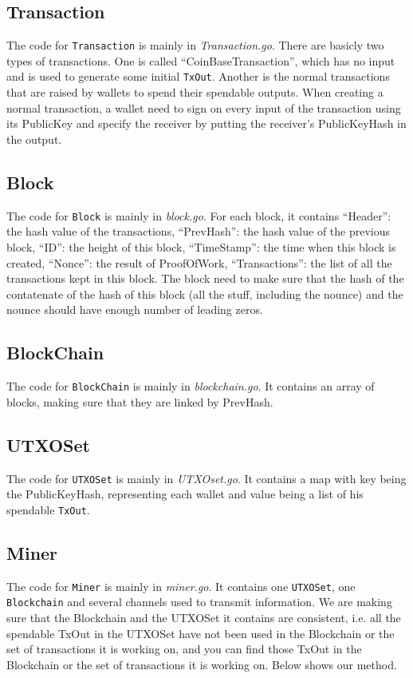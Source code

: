 \documentclass{article}
\begin{document}
\begin{spacing}{1.0}
		\subsection{Transaction}
		The code for \texttt{Transaction} is mainly in \textit{Transaction.go}. There are basicly two types of transactions. One is called ``CoinBaseTransaction'', which has no input and is used to generate some initial \texttt{TxOut}. Another is 
		the normal transactions that are raised by wallets to spend their spendable outputs.
		When creating a normal transaction, a wallet need to sign on every input of the transaction using its PublicKey and specify the receiver by putting the receiver's PublicKeyHash in the output.
		
		\subsection{Block}
		The code for \texttt{Block} is mainly in \textit{block.go}. For each block, it contains ``Header'': the hash value of the transactions, ``PrevHash'': the hash value of the previous block, ``ID'': the height of this block, 
		``TimeStamp'': the time when this block is created, ``Nonce'': the result of ProofOfWork, ``Transactions'': the list of all the transactions kept in this block. The block need to make sure that the hash of the contatenate of the hash of this block (all the stuff, including the nounce) and the nounce should have enough number of leading zeros.


		\subsection{BlockChain}
		The code for \texttt{BlockChain} is mainly in \textit{blockchain.go}. It contains an array of blocks, making sure that they are linked by PrevHash.

		\subsection{UTXOSet}
		The code for \texttt{UTXOSet} is mainly in \textit{UTXOset.go}. It contains a map with key being the PublicKeyHash, representing each wallet and value being a list of his spendable \texttt{TxOut}.

		\subsection{Miner}
		The code for \texttt{Miner} is mainly in \textit{miner.go}. It contains one \texttt{UTXOSet}, one \texttt{Blockchain} and several channels used to transmit information. We are making sure that the Blockchain and the UTXOSet it contains are consistent, i.e. all the spendable TxOut in the 
		UTXOSet have not been used in the Blockchain or the set of transactions it is working on, and you can find those TxOut in the Blockchain or the set of transactions it is working on. Below shows our method.

\end{spacing}
\end{document}
